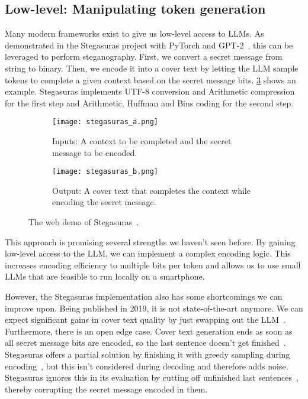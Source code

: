 \subsection{Low-level: Manipulating token generation}
\label{sec:lowLevelManipulatingTokenGeneration}
Many modern frameworks exist to give us low-level access to \glspl{LLM}. As demonstrated in the Stegasuras project with PyTorch and GPT-2~\cite{zieglerNeuralLinguisticSteganography2019,zieglerHarvardnlpNeuralSteganography2025,zieglerStegasuras2025}, this can be leveraged to perform steganography. First, we convert a secret message from string to binary. Then, we encode it into a cover text by letting the \gls{LLM} sample tokens to complete a given context based on the secret message bits. \cref{fig:stegasuras} shows an example. Stegasuras implements UTF-8 conversion and Arithmetic compression for the first step and Arithmetic, Huffman and Bins coding for the second step.

\begin{figure}
	\begin{wide}
		\captionsetup{width=\linewidth}

		\begin{subfigure}{\linewidth}
			\centering
			\texttt{[image: stegasuras\_a.png]}
			\caption{Inputs: A context to be completed and the secret message to be encoded.}
			\label{fig:stegasurasA}
		\end{subfigure}

		\begin{subfigure}{\linewidth}
			\centering
			\texttt{[image: stegasuras\_b.png]}
			\caption{Output: A cover text that completes the context while encoding the secret message.}
			\label{fig:stegasurasB}
		\end{subfigure}

		\caption[Stegasuras]{The web demo of Stegasuras~\cite{zieglerStegasuras2025}.}
		\label{fig:stegasuras}
	\end{wide}
\end{figure}

This approach is promising several strengths we haven't seen before. By gaining low-level access to the \gls{LLM}, we can implement a complex encoding logic. This increases encoding efficiency to multiple bits per token and allows us to use small \glspl{LLM} that are feasible to run locally on a smartphone.

However, the Stegasuras implementation also has some shortcomings we can improve upon. Being published in 2019, it is not state-of-the-art anymore. We can expect significant gains in cover text quality by just swapping out the \gls{LLM}~\cite{wuGenerativeTextSteganography2024}. Furthermore, there is an open edge case. Cover text generation ends as soon as all secret message bits are encoded, so the last sentence doesn't get finished~\cite{zieglerStegasuras2025}. Stegasuras offers a partial solution by finishing it with greedy sampling during encoding~\cite{zieglerHarvardnlpNeuralSteganography2025}, but this isn't considered during decoding and therefore adds noise. Stegasuras ignores this in its evaluation by cutting off unfinished last sentences~\cite{zieglerNeuralLinguisticSteganography2019}, thereby corrupting the secret message encoded in them.

